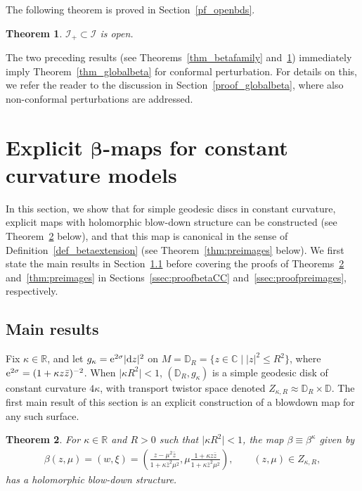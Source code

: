 \documentclass[10pt,a4paper]{amsart}
\numberwithin{equation}{section}
\newtheorem{Theorem}{Theorem}[section]
\theoremstyle{definition}
\newcommand{\1}{{\bf 1}}
\newcommand \Cm { \mathbb{C}}
\newcommand \Dm { \mathbb{D}}
\newcommand \Rm { \mathbb{R}}
\newcommand \zbar { \bar{z}}
\begin{document}
The following theorem is proved in Section~\ref{pf_openbds}.

\begin{Theorem}\label{thm_openbds} $\mathcal I_+\subset \mathcal I$ is open.
\end{Theorem}



The two preceding results (see Theorems~\ref{thm_betafamily} and~\ref{thm_openbds}) immediately imply Theorem~\ref{thm_globalbeta} for conformal perturbation. For details on this, we refer the reader to the discussion in Section~\ref{proof_globalbeta}, where also non-conformal perturbations are addressed.

\section[Explicit beta-maps for constant curvature models]{Explicit $\boldsymbol{\beta}$-maps for constant curvature models}\label{s_fra}

In this section, we show that for simple geodesic discs in constant curvature, explicit maps with holomorphic blow-down structure can be constructed (see Theorem~\ref{thm:betaCC} below), and that this map is canonical in the sense of Definition~\ref{def_betaextension} (see Theorem~\ref{thm:preimages} below). We first state the main results in Section~\ref{ssec:main} before covering the proofs of Theorems~\ref{thm:betaCC} and~\ref{thm:preimages} in Sections~\ref{ssec:proofbetaCC} and~\ref{ssec:proofpreimages}, respectively.

\subsection{Main results} \label{ssec:main}

Fix $\kappa\in \Rm$, and let $g_\kappa = {\rm e}^{2\sigma} |{\rm d}z|^2$ on $M = \Dm_R = \big\{z\in \Cm \mid |z|^2\le R^2\big\}$, where ${\rm e}^{2\sigma} = (1+\kappa z\zbar)^{-2}$. When $\big|\kappa R^2\big|<1$, $(\Dm_R, g_\kappa)$ is a simple geodesic disk of constant curvature $4\kappa${, with transport twistor space denoted $Z_{\kappa,R}\approx \Dm_R\times \Dm$}. The first main result of this section is an explicit construction of a blowdown map for any such surface.

\begin{Theorem}\label{thm:betaCC}
 For $\kappa\in \Rm$ and $R>0$ such that $\big|\kappa R^2\big|<1$, the map $\beta \equiv \beta^\kappa$ given by
 \begin{align}
	 \beta (z,\mu) = (w,\xi) = \left( \frac{z-\mu^2\zbar}{1+\kappa \zbar^2 \mu^2}, \mu \frac{1+\kappa z\zbar}{1+\kappa\zbar^2 \mu^2} \right), \qquad (z,\mu)\in Z_{\kappa,R},
	\label{eq:betakappa}
 \end{align}
 has a holomorphic blow-down structure.
\end{Theorem}
\end{document}
